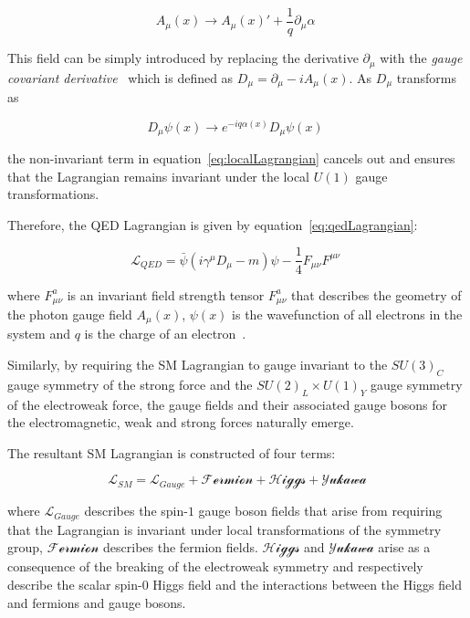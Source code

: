 \begin{equation}
A_{\mu}(x) \rightarrow A_{\mu}(x)' + \frac{1}{q} \partial_{\mu} \alpha\;
\label{eq:vectorField}
\end{equation}

This field can be simply introduced by replacing the derivative $\partial_{\mu}$ with the \emph{gauge covariant derivative}~\cite{QFT} which is defined as $D_{\mu} = \partial_{\mu} - i A_{\mu}(x)$.
As $D_{\mu}$ transforms as 

\begin{equation}
D_{\mu}\psi(x) \rightarrow e^{-i q \alpha (x) } D_{\mu} \psi(x) \;
\label{eq:Dtransform}
\end{equation}

the non-invariant term in equation~\ref{eq:localLagrangian} cancels out and ensures that the Lagrangian remains invariant under the local $U(1)$ gauge transformations.

Therefore, the QED Lagrangian is given by equation~\ref{eq:qedLagrangian}:

\begin{equation}
\mathcal{L}_{QED} = \bar{\psi} (i {\gamma}^{\mu} D_{\mu} - m) \psi - \frac{1}{4} F_{\mu \nu} F^{\mu \nu} \;
\label{eq:qedLagrangian}
\end{equation}

where $F^{a}_{\mu \nu}$ is an invariant field strength tensor $F^{a}_{\mu \nu}$ that describes the geometry of the photon gauge field $A_{\mu}(x)$, $\psi(x)$ is the wavefunction of all electrons in the system and $q$ is the charge of an electron~\cite{QFT,LagrangiansSM}.

Similarly, by requiring the SM Lagrangian to gauge invariant to the $SU(3)_{C}$ gauge symmetry of the strong force and the $SU(2)_{L} \times U(1)_{Y}$ gauge symmetry of the electroweak force, the gauge fields and their associated gauge bosons for the electromagnetic, weak and strong forces naturally emerge.

The resultant SM Lagrangian is constructed of four terms:

\begin{equation}
\mathcal{L}_{SM} = \mathcal{L}_{Gauge} + \mathcal{Fermion} + \mathcal{Higgs} + \mathcal{Yukawa}
\end{equation}

where $\mathcal{L}_{Gauge}$ describes the spin-$1$ gauge boson fields that arise from requiring that the Lagrangian is invariant under local transformations of the symmetry group, $\mathcal{Fermion}$ describes the fermion fields.
$\mathcal{Higgs}$ and $\mathcal{Yukawa}$ arise as a consequence of the breaking of the electroweak symmetry and respectively describe the scalar spin-0 Higgs field and the interactions between the Higgs field and fermions and gauge bosons.

